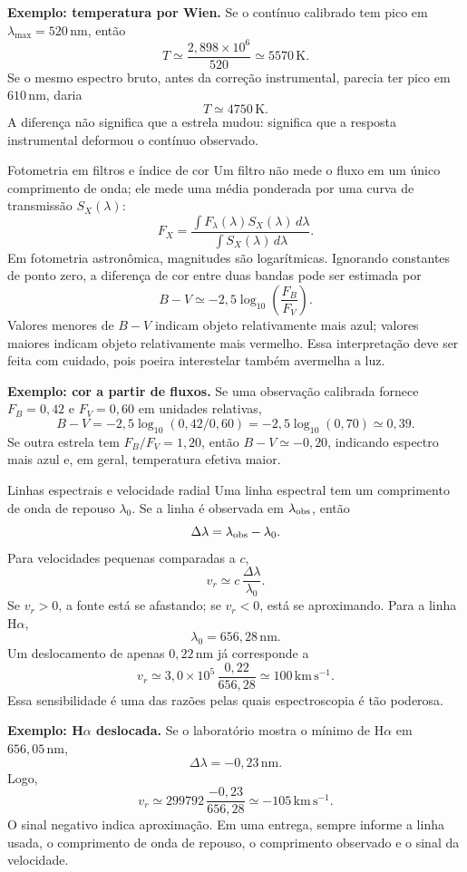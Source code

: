 \documentclass[11pt,a4paper]{article}
\begin{document}
\textbf{Exemplo: temperatura por Wien.} Se o contínuo calibrado tem pico em $\lambda_{\max}=520\,\mathrm{nm}$, então
\[
T\simeq\frac{2{,}898\times10^6}{520}\simeq5570\,\mathrm{K}.
\]
Se o mesmo espectro bruto, antes da correção instrumental, parecia ter pico em $610\,\mathrm{nm}$, daria
\[
T\simeq4750\,\mathrm{K}.
\]
A diferença não significa que a estrela mudou: significa que a resposta instrumental deformou o contínuo observado.

\begin{lessonblock}{Fotometria em filtros e índice de cor}
Um filtro não mede o fluxo em um único comprimento de onda; ele mede uma média ponderada por uma curva de transmissão $S_X(\lambda)$:
\[
F_X=\frac{\int F_\lambda(\lambda)S_X(\lambda)\,d\lambda}
{\int S_X(\lambda)\,d\lambda}.
\]
Em fotometria astronômica, magnitudes são logarítmicas. Ignorando constantes de ponto zero, a diferença de cor entre duas bandas pode ser estimada por
\[
B-V\simeq -2{,}5\log_{10}\left(\frac{F_B}{F_V}\right).
\]
Valores menores de $B-V$ indicam objeto relativamente mais azul; valores maiores indicam objeto relativamente mais vermelho. Essa interpretação deve ser feita com cuidado, pois poeira interestelar também avermelha a luz.
\end{lessonblock}

\textbf{Exemplo: cor a partir de fluxos.} Se uma observação calibrada fornece $F_B=0{,}42$ e $F_V=0{,}60$ em unidades relativas,
\[
B-V=-2{,}5\log_{10}(0{,}42/0{,}60)
=-2{,}5\log_{10}(0{,}70)\simeq0{,}39.
\]
Se outra estrela tem $F_B/F_V=1{,}20$, então $B-V\simeq-0{,}20$, indicando espectro mais azul e, em geral, temperatura efetiva maior.

\begin{lessonblock}{Linhas espectrais e velocidade radial}
Uma linha espectral tem um comprimento de onda de repouso $\lambda_0$. Se a linha é observada em $\lambda_{\rm obs}$, então
\[
\Delta\lambda=\lambda_{\rm obs}-\lambda_0.
\]
Para velocidades pequenas comparadas a $c$,
\[
v_r\simeq c\,\frac{\Delta\lambda}{\lambda_0}.
\]
Se $v_r>0$, a fonte está se afastando; se $v_r<0$, está se aproximando. Para a linha H$\alpha$,
\[
\lambda_0=656{,}28\,\mathrm{nm}.
\]
Um deslocamento de apenas $0{,}22\,\mathrm{nm}$ já corresponde a
\[
v_r\simeq 3{,}0\times10^5\,\frac{0{,}22}{656{,}28}
\simeq100\,\mathrm{km\,s^{-1}}.
\]
Essa sensibilidade é uma das razões pelas quais espectroscopia é tão poderosa.
\end{lessonblock}

\textbf{Exemplo: H$\alpha$ deslocada.} Se o laboratório mostra o mínimo de H$\alpha$ em $656{,}05\,\mathrm{nm}$,
\[
\Delta\lambda=-0{,}23\,\mathrm{nm}.
\]
Logo,
\[
v_r\simeq 299792\,\frac{-0{,}23}{656{,}28}
\simeq -105\,\mathrm{km\,s^{-1}}.
\]
O sinal negativo indica aproximação. Em uma entrega, sempre informe a linha usada, o comprimento de onda de repouso, o comprimento observado e o sinal da velocidade.
\end{document}
